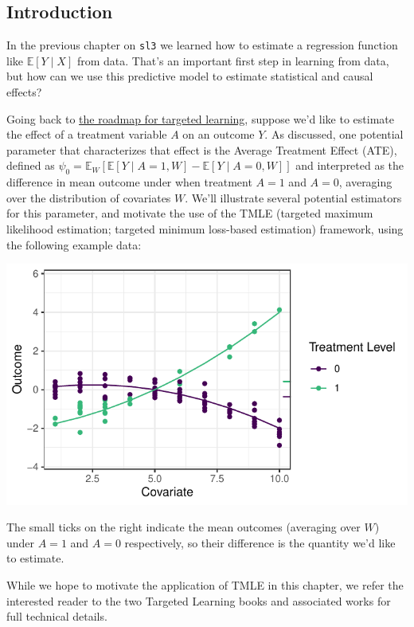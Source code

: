 \documentclass[12pt, krantz2,]{krantz}
\theoremstyle{definition}
\theoremstyle{definition}
\theoremstyle{definition}
\newcommand{\1}{\mathbbm{1}}
\begin{document}
\hypertarget{tmle-intro}{%
\subsection{Introduction}\label{tmle-intro}}

In the previous chapter on \texttt{sl3} we learned how to estimate a regression
function like \(\mathbb{E}[Y \mid X]\) from data. That's an important first step
in learning from data, but how can we use this predictive model to estimate
statistical and causal effects?

Going back to \protect\hyperlink{intro}{the roadmap for targeted learning}, suppose we'd like to
estimate the effect of a treatment variable \(A\) on an outcome \(Y\). As discussed,
one potential parameter that characterizes that effect is the Average Treatment
Effect (ATE), defined as \(\psi_0 = \mathbb{E}_W[\mathbb{E}[Y \mid A=1,W] - \mathbb{E}[Y \mid A=0,W]]\) and interpreted as the difference in mean outcome
under when treatment \(A=1\) and \(A=0\), averaging over the distribution of
covariates \(W\). We'll illustrate several potential estimators for this
parameter, and motivate the use of the TMLE (targeted maximum likelihood
estimation; targeted minimum loss-based estimation) framework, using the
following example data:

\begin{center}\includegraphics[width=0.8\linewidth]{img/misc/tmle_sim/schematic_1_truedgd} \end{center}

The small ticks on the right indicate the mean outcomes (averaging over \(W\))
under \(A=1\) and \(A=0\) respectively, so their difference is the quantity we'd
like to estimate.

While we hope to motivate the application of TMLE in this chapter, we refer the
interested reader to the two Targeted Learning books and associated works for
full technical details.
\end{document}
